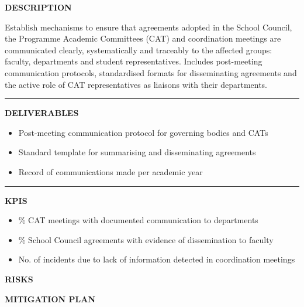 \documentclass[11pt,a4paper]{scrreprt}
\newcommand{\fieldlabel}[1]{%
  {\footnotesize\sffamily\bfseries\color{mutedcolor}\MakeUppercase{#1}}\par\nopagebreak[4]
}
\newcommand{\fieldsep}{\vspace{3pt}\noindent\textcolor{bordercolor}{\rule{\linewidth}{0.4pt}}\vspace{3pt}\par}
\begin{document}
\begin{tcolorbox}[pabox={gobcolor}{A.P.3.3 \enspace\textbullet\enspace Effective transmission of agreements concerning institutional information}]

\fieldlabel{Description}
{\small Establish mechanisms to ensure that agreements adopted in the School Council, the Programme Academic Committees (CAT) and coordination meetings are communicated clearly, systematically and traceably to the affected groups: faculty, departments and student representatives. Includes post-meeting communication protocols, standardised formats for disseminating agreements and the active role of CAT representatives as liaisons with their departments.}\par
\fieldsep
\fieldlabel{Deliverables}
{\small \begin{itemize}[noitemsep,topsep=2pt]
\item Post-meeting communication protocol for governing bodies and CATs
\item Standard template for summarising and disseminating agreements
\item Record of communications made per academic year
\end{itemize}}\par
\fieldsep
\fieldlabel{KPIs}
{\small \begin{itemize}[noitemsep,topsep=2pt]
\item \% CAT meetings with documented communication to departments
\item \% School Council agreements with evidence of dissemination to faculty
\item No. of incidents due to lack of information detected in coordination meetings
\end{itemize}}\par
\end{tcolorbox}
\begin{tcolorbox}[riskbox]
{\footnotesize\sffamily\bfseries\color{red!50!black} RISKS}\par{}
\end{tcolorbox}
\begin{tcolorbox}[mitbox]
{\footnotesize\sffamily\bfseries\color{green!40!black} MITIGATION PLAN}\par{}
\end{tcolorbox}
\vspace{8pt}
\end{document}

